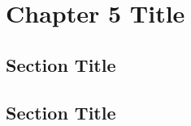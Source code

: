 \documentclass[../main.tex]{subfiles}
\begin{document}
\newpage
\onehalfspacing
\RaggedRight
\setcounter{chapter}{4}
\thesischapterstyle

\chapter{Chapter 5 Title}\label{chap5:short-label}

\section{Section Title}
\lipsum[1]

\section{Section Title}
\lipsum[2]
\end{document}
